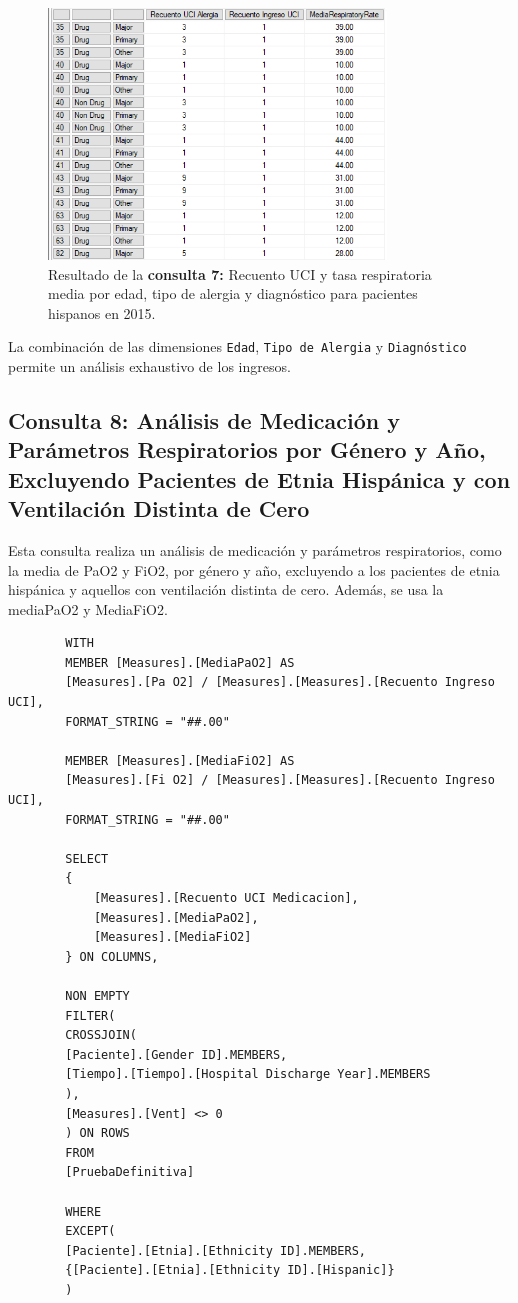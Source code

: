\documentclass[12pt, a4paper, twoside]{article}
\begin{document}
	\begin{figure}[H]
		\centering
		\includegraphics[width=0.8\textwidth]{image/consulta7.png}
		\caption{Resultado de la \textbf{consulta 7:} Recuento UCI y tasa respiratoria media por edad, tipo de alergia y diagnóstico para pacientes hispanos en 2015.}
		\label{fig:consulta7}
	\end{figure}
	
	La combinación de las dimensiones \texttt{Edad}, \texttt{Tipo de Alergia} y \texttt{Diagnóstico} permite un análisis exhaustivo de los ingresos.
	
	\subsection{Consulta 8: Análisis de Medicación y Parámetros Respiratorios por Género y Año, Excluyendo Pacientes de Etnia Hispánica y con Ventilación Distinta de Cero}
	
	Esta consulta realiza un análisis de medicación y parámetros respiratorios, como la media de PaO2 y FiO2, por género y año, excluyendo a los pacientes de etnia hispánica y aquellos con ventilación distinta de cero. Además, se usa la mediaPaO2 y MediaFiO2.
	
	\begin{verbatim}
		WITH 
		MEMBER [Measures].[MediaPaO2] AS
		[Measures].[Pa O2] / [Measures].[Measures].[Recuento Ingreso UCI],
		FORMAT_STRING = "##.00"
		
		MEMBER [Measures].[MediaFiO2] AS
		[Measures].[Fi O2] / [Measures].[Measures].[Recuento Ingreso UCI],
		FORMAT_STRING = "##.00"
		
		SELECT 
		{ 
			[Measures].[Recuento UCI Medicacion],
			[Measures].[MediaPaO2],
			[Measures].[MediaFiO2]
		} ON COLUMNS,
		
		NON EMPTY 
		FILTER(
		CROSSJOIN(
		[Paciente].[Gender ID].MEMBERS,
		[Tiempo].[Tiempo].[Hospital Discharge Year].MEMBERS 
		),
		[Measures].[Vent] <> 0
		) ON ROWS
		FROM 
		[PruebaDefinitiva]
		
		WHERE 
		EXCEPT(
		[Paciente].[Etnia].[Ethnicity ID].MEMBERS,
		{[Paciente].[Etnia].[Ethnicity ID].[Hispanic]}
		)
	\end{verbatim}
	
\end{document}
